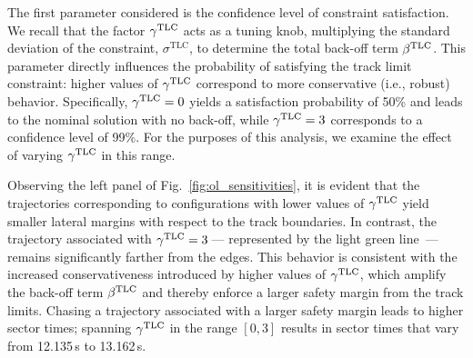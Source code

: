 The first parameter considered is the confidence level of constraint satisfaction.
We recall that the factor $\gamma^\textrm{TLC}$ acts as a tuning knob, multiplying the standard deviation of the constraint, $\sigma^\textrm{TLC}$, to determine the total back-off term $\beta^\textrm{TLC}$.
This parameter directly influences the probability of satisfying the track limit constraint: higher values of $\gamma^\textrm{TLC}$ correspond to more conservative (i.e., robust) behavior.
Specifically, $\gamma^\textrm{TLC} = 0$ yields a satisfaction probability of 50\% and leads to the nominal solution with no back-off, while $\gamma^\textrm{TLC} = 3$ corresponds to a confidence level of 99\%.
For the purposes of this analysis, we examine the effect of varying $\gamma^\textrm{TLC}$ in this range.


Observing the left panel of Fig.~\ref{fig:ol_sensitivities}, it is evident that the trajectories corresponding to configurations with lower values of $\gamma^\textrm{TLC}$ yield smaller lateral margins with respect to the track boundaries. In contrast, the trajectory associated with $\gamma^\textrm{TLC} = 3$\,--- represented by the light green line \,--- remains significantly farther from the edges.
This behavior is consistent with the increased conservativeness introduced by higher values of $\gamma^\textrm{TLC}$, which amplify the back-off term $\beta^\textrm{TLC}$ and thereby enforce a larger safety margin from the track limits.
Chasing a trajectory associated with a larger safety margin leads to higher sector times; spanning $\gamma^\textrm{TLC}$ in the range $\left[0,3\right]$ results in sector times that vary from 12.135\,s to 13.162\,s.

